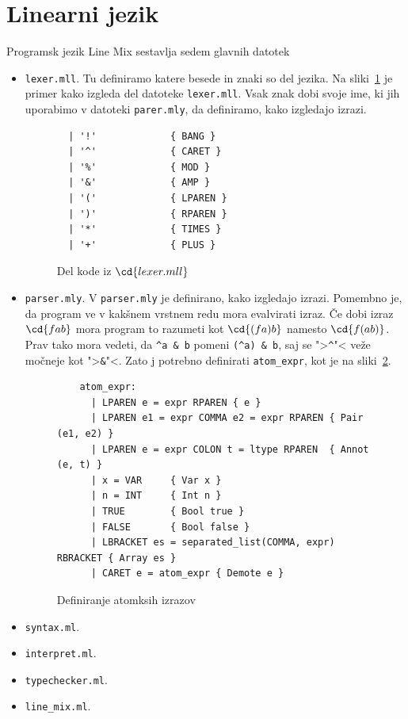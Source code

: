 \section{Linearni jezik}

Programsk jezik Line Mix sestavlja sedem glavnih datotek
%
\begin{itemize}
    \item \verb|lexer.mll|. Tu definiramo katere besede in znaki so del jezika. Na sliki~\ref{cd:lexer} je primer kako izgleda del datoteke \verb|lexer.mll|. Vsak znak dobi svoje ime, ki jih uporabimo v datoteki \verb|parer.mly|, da definiramo, kako izgledajo izrazi.
\begin{figure}[h]
    \begin{verbatim}
  | '!'             { BANG }
  | '^'             { CARET }
  | '%'             { MOD }
  | '&'             { AMP }
  | '('             { LPAREN }
  | ')'             { RPAREN }
  | '*'             { TIMES }
  | '+'             { PLUS }
    \end{verbatim}
    \caption{Del kode iz \(\cd{lexer.mll}\)}\label{cd:lexer}
\end{figure}    

    \item \verb|parser.mly|. V \verb|parser.mly|  je definirano, kako izgledajo izrazi. Pomembno je, da program ve v kakšnem vrstnem redu mora evalvirati izraz. Če dobi izraz \(\cd{f a b}\) mora program to razumeti kot \(\cd{(f a) b}\) namesto \(\cd{f (a b)}\).
    Prav tako mora vedeti, da \verb|^a & b| 
    pomeni \verb|(^a) & b|, saj se ">\verb|^|"< veže močneje kot ">\verb|&|"<.
    Zato j potrebno definirati \verb|atom_expr|, kot je na sliki~\ref{cd:atom_expr}.
\begin{figure}[h]
     \small
        \begin{verbatim}
    atom_expr:
      | LPAREN e = expr RPAREN { e }
      | LPAREN e1 = expr COMMA e2 = expr RPAREN { Pair (e1, e2) }
      | LPAREN e = expr COLON t = ltype RPAREN  { Annot (e, t) }
      | x = VAR     { Var x }
      | n = INT     { Int n }
      | TRUE        { Bool true }
      | FALSE       { Bool false }
      | LBRACKET es = separated_list(COMMA, expr) RBRACKET { Array es }
      | CARET e = atom_expr { Demote e }
        \end{verbatim}
        \caption{Definiranje atomksih izrazov}\label{cd:atom_expr}
\end{figure}
    
    
    
    
    
    

    \item \verb|syntax.ml|. 
    \item \verb|interpret.ml|. 
    \item \verb|typechecker.ml|. 
    \item \verb|line_mix.ml|. 
\end{itemize}